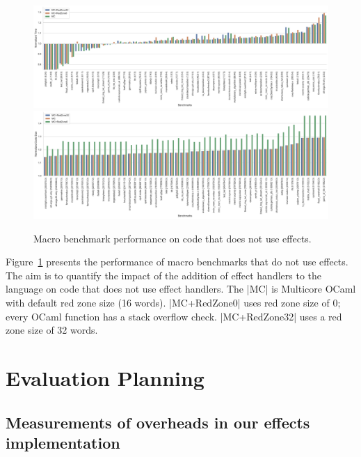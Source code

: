 \documentclass[sigplan,10pt,review,anonymous]{acmart}\settopmatter{printfolios=true,printccs=false,printacmref=false}
\begin{document}
\begin{figure}
	\begin{minipage}{\linewidth}
	\includegraphics[width=\linewidth]{sandmark-notebook/sandmark_time}
	\includegraphics[width=\linewidth]{sandmark-notebook/sandmark_codesize}
	\end{minipage}
	\caption{Macro benchmark performance on code that does not use effects.}
	\label{res:macro}
\end{figure}

Figure~\ref{res:macro} presents the performance of macro benchmarks that do not
use effects. The aim is to quantify the impact of the addition of effect
handlers to the language on code that does not use effect handlers. The |MC| is
Multicore OCaml with default red zone size (16 words). |MC+RedZone0| uses red
zone size of 0; every OCaml function has a stack overflow check. |MC+RedZone32|
uses a red zone size of 32 words.

\section*{Evaluation Planning}

\subsection{Measurements of overheads in our effects implementation}
\end{document}
